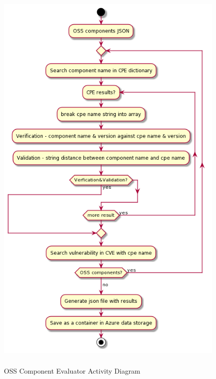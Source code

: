 \begin{figure}[h!]
	\includegraphics[width=15cm,height=20cm]{includes/OSS_Evaluator_Activity_Diagram.png}
	\centering
	\caption{\acs{OSS} Component Evaluator Activity Diagram}
	\label{fig:Evaluator_Activity_Diagram}
\end{figure} 
\newpage                                                                                      \newpage            
